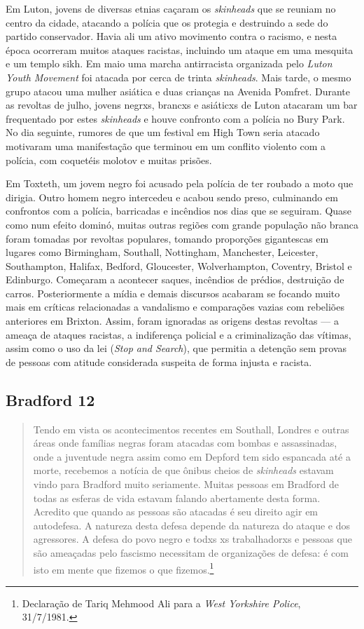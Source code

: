Em Luton, jovens de diversas etnias caçaram os \emph{skinheads} que se reuniam no centro da cidade, atacando a polícia que os protegia e destruindo a sede do partido conservador. Havia ali um ativo movimento contra o racismo, e nesta época ocorreram muitos ataques racistas, incluindo um ataque em uma mesquita e um templo sikh. Em maio uma marcha antirracista organizada pelo \emph{Luton Youth Movement} foi atacada por cerca de trinta \emph{skinheads}. Mais tarde, o mesmo grupo atacou uma mulher asiática e duas crianças na Avenida Pomfret. Durante as revoltas de julho, jovens negrxs, brancxs e asiáticxs de Luton atacaram um bar frequentado por estes \emph{skinheads} e houve confronto com a polícia no Bury Park. No dia seguinte, rumores de que um festival em High Town seria atacado motivaram uma manifestação que terminou em um conflito violento com a polícia, com coquetéis molotov e muitas prisões.

Em Toxteth, um jovem negro foi acusado pela polícia de ter roubado a moto que dirigia. Outro homem negro intercedeu e acabou sendo preso, culminando em confrontos com a polícia, barricadas e incêndios nos dias que se seguiram. Quase como num efeito dominó, muitas outras regiões com grande população não branca foram tomadas por revoltas populares, tomando proporções gigantescas em lugares como Birmingham, Southall, Nottingham, Manchester, Leicester, Southampton, Halifax, Bedford, Gloucester, Wolverhampton, Coventry, Bristol e Edinburgo. Começaram a acontecer saques, incêndios de prédios, destruição de carros. Posteriormente a mídia e demais discursos acabaram se focando muito mais em críticas relacionadas a vandalismo e comparações vazias com rebeliões anteriores em Brixton. Assim, foram ignoradas as origens destas revoltas --- a ameaça de ataques racistas, a indiferença policial e a criminalização das vítimas, assim como o uso da lei  (\emph{Stop and Search}), que permitia a detenção sem provas de pessoas com atitude considerada suspeita de forma injusta e racista.

\subsection{Bradford 12}

\begin{quote}
Tendo em vista os acontecimentos recentes em Southall, Londres e outras áreas onde famílias negras foram atacadas com bombas e assassinadas, onde a juventude negra assim como em Depford tem sido espancada até a morte, recebemos a notícia de que ônibus cheios de \emph{skinheads} estavam vindo para Bradford muito seriamente. Muitas pessoas em Bradford de todas as esferas de vida estavam falando abertamente desta forma. Acredito que quando as pessoas são atacadas é seu direito agir em autodefesa. A natureza desta defesa depende da natureza do ataque e dos agressores. A defesa do povo negro e todxs xs trabalhadorxs e pessoas que são ameaçadas pelo fascismo necessitam de organizações de defesa: é com isto em mente que fizemos o que fizemos.\footnote{Declaração de Tariq Mehmood Ali para a \textit{West Yorkshire Police}, 31/7/1981.}
\end{quote}

